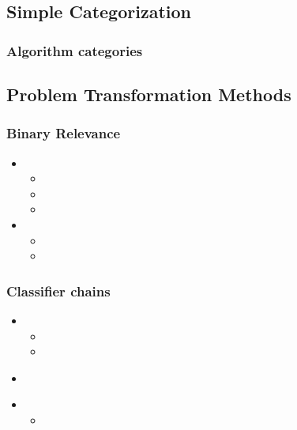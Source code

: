 \documentclass{beamer}
\begin{document}

\subsection{Simple Categorization}

\begin{frame}
\frametitle{Algorithm categories}

\end{frame}

\subsection{Problem Transformation Methods}

\begin{frame}
\frametitle{Binary Relevance}

\begin{itemize}
\item <2-> 
\begin{itemize}
\item <3-> 
\item <4-> 
\item <5-> 
\end{itemize}
\item <6-> 
\begin{itemize}
\item <7-> 
\item <8-> 
\end{itemize}
\end{itemize}
\end{frame}

\begin{frame}
\frametitle{Classifier chains}
\begin{itemize}
\item <2-> 
\begin{itemize}
\item 
\item <4-> 
\end{itemize}
\end{itemize}
\begin{itemize}
\item<5-> 
\end{itemize}

\begin{itemize}
\item <7-> 
\begin{itemize}
\item <8-> 
\end{itemize}
\end{itemize}
\end{frame}
\end{document}
